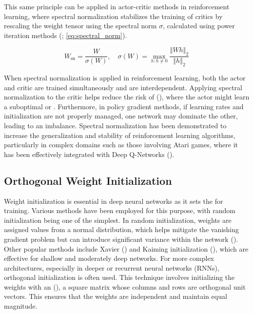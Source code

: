 \bigskip

\noindent  This same principle can be applied in actor-critic methods in reinforcement learning, where spectral normalization stabilizes the training of critics by rescaling the weight tensor using the spectral norm $\sigma$, calculated using power iteration methods (\textcolor{deepblue}{\cite{pytorch2}; \autoref{eq:spectral_norm}}). 

\begin{equation}
    W_{\text{sn}} = \frac{W}{\sigma(W)}, \quad \sigma(W) = \underset{h: h \neq 0}{\max}\frac{\left\Vert W h \right\Vert_2}{\left\Vert h \right\Vert_2}
    \label{eq:spectral_norm}
\end{equation}

\noindent When spectral normalization is applied in reinforcement learning, both the actor and critic are trained simultaneously and are interdependent. Applying spectral normalization to the critic helps reduce the risk of  (\cite{dohare2023overcoming}), where the actor might learn a suboptimal or . Furthermore, in policy gradient methods, if learning rates and initialization are not properly managed, one network may dominate the other, leading to an imbalance. Spectral normalization has been demonstrated to increase the generalization and stability of reinforcement learning algorithms, particularly in complex domains such as those involving Atari games, where it has been effectively integrated with Deep Q-Networks (\cite{gogianu2021spectral}).

\subsection{Orthogonal Weight Initialization}
\label{subsec:ortho}

\noindent Weight initialization is essential in deep neural networks as it sets the  for training. Various methods have been employed for this purpose, with random initialization being one of the simplest. In random initialization, weights are assigned values from a normal distribution, which helps mitigate the vanishing gradient problem but can introduce significant variance within the network (\cite{hu2020provable}). Other popular methods include Xavier (\cite{kumar2017weight}) and Kaiming initialization (\cite{he2015delving}), which are effective for shallow and moderately deep networks. For more complex architectures, especially in deeper or recurrent neural networks (RNNs), orthogonal initialization is often used. This technique involves initializing the weights with an  (\cite{wiki:Orthogonal_matrix}), a square matrix whose columns and rows are orthogonal unit vectors. This ensures that the weights are independent and maintain equal magnitude.

